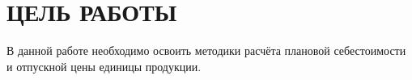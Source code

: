 \section{ЦЕЛЬ РАБОТЫ}

В данной работе необходимо освоить методики расчёта плановой себестоимости
и отпускной цены единицы продукции.

\newpage
